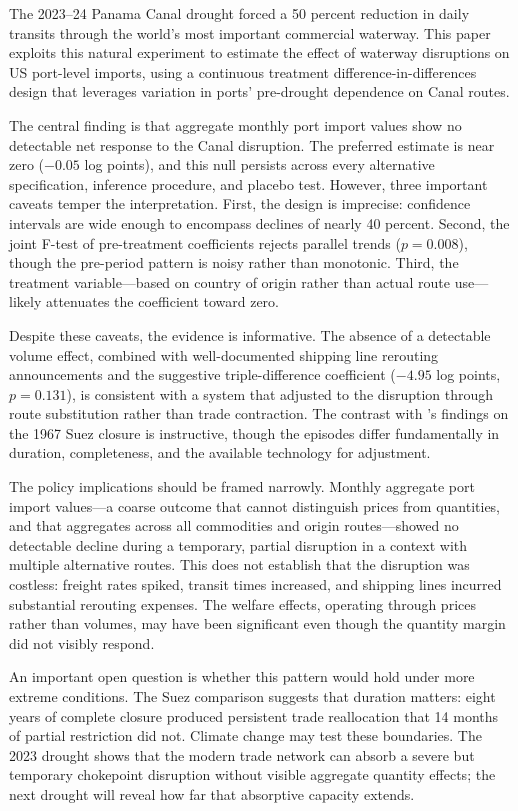 \documentclass[12pt]{article}
\begin{document}
The 2023--24 Panama Canal drought forced a 50 percent reduction in daily transits through the world's most important commercial waterway. This paper exploits this natural experiment to estimate the effect of waterway disruptions on US port-level imports, using a continuous treatment difference-in-differences design that leverages variation in ports' pre-drought dependence on Canal routes.

The central finding is that aggregate monthly port import values show no detectable net response to the Canal disruption. The preferred estimate is near zero ($-0.05$ log points), and this null persists across every alternative specification, inference procedure, and placebo test. However, three important caveats temper the interpretation. First, the design is imprecise: confidence intervals are wide enough to encompass declines of nearly 40 percent. Second, the joint F-test of pre-treatment coefficients rejects parallel trends ($p = 0.008$), though the pre-period pattern is noisy rather than monotonic. Third, the treatment variable---based on country of origin rather than actual route use---likely attenuates the coefficient toward zero.

Despite these caveats, the evidence is informative. The absence of a detectable volume effect, combined with well-documented shipping line rerouting announcements and the suggestive triple-difference coefficient ($-4.95$ log points, $p = 0.131$), is consistent with a system that adjusted to the disruption through route substitution rather than trade contraction. The contrast with \citet{feyrer2021distance}'s findings on the 1967 Suez closure is instructive, though the episodes differ fundamentally in duration, completeness, and the available technology for adjustment.

The policy implications should be framed narrowly. Monthly aggregate port import values---a coarse outcome that cannot distinguish prices from quantities, and that aggregates across all commodities and origin routes---showed no detectable decline during a temporary, partial disruption in a context with multiple alternative routes. This does not establish that the disruption was costless: freight rates spiked, transit times increased, and shipping lines incurred substantial rerouting expenses. The welfare effects, operating through prices rather than volumes, may have been significant even though the quantity margin did not visibly respond.

An important open question is whether this pattern would hold under more extreme conditions. The Suez comparison suggests that duration matters: eight years of complete closure produced persistent trade reallocation that 14 months of partial restriction did not. Climate change may test these boundaries. The 2023 drought shows that the modern trade network can absorb a severe but temporary chokepoint disruption without visible aggregate quantity effects; the next drought will reveal how far that absorptive capacity extends.
\end{document}
